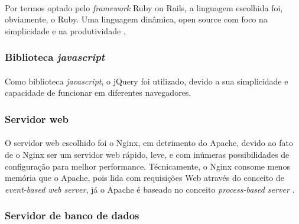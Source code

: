 \documentclass[11pt]{article}
\begin{document}
          \paragraph{}
          
          Por termos optado pelo {\em framework} Ruby on Rails, a linguagem 
          escolhida foi, obviamente, o Ruby. Uma 
          linguagem dinâmica, open source com foco na simplicidade e na 
          produtividade \cite{website:ruby}.
          
        \subsubsection{Biblioteca {\em javascript}}

          \paragraph{}
          
          Como biblioteca {\em javascript}, o jQuery \cite{website:jquery} foi 
          utilizado, devido a sua simplicidade e capacidade de funcionar em diferentes
          navegadores. 
          
        \subsubsection{Servidor web}

          \paragraph{}
          
          O servidor web escolhido foi o Nginx, em detrimento do Apache, devido ao fato de
          o Nginx ser um servidor web rápido, leve, e com inúmeras 
          possibilidades de configuração para melhor performance.
          Técnicamente, o Nginx consome menos memória que o Apache, 
          pois lida com requisições Web através do conceito de 
          {\em event-based web server}, já o Apache é baseado no 
          conceito {\em process-based server} \cite{website:nginx}. 
          
        \subsubsection{Servidor de banco de dados}

          \paragraph{}
          
\end{document}
